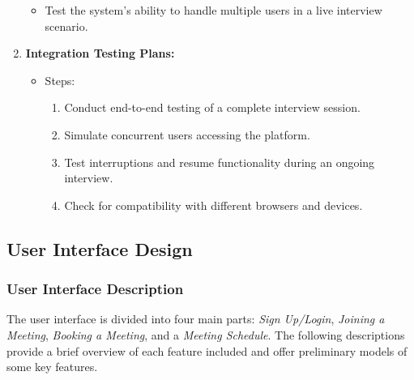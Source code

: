 \documentclass{article}
\begin{document}
\begin{enumerate}
\begin{itemize}
    \item Test the system's ability to handle multiple users in a live interview scenario.
  \end{itemize}
  \item \textbf{Integration Testing Plans:}
  \begin{itemize}
    \item Steps:
    \begin{enumerate}
      \item Conduct end-to-end testing of a complete interview session.
      \item Simulate concurrent users accessing the platform.
      \item Test interruptions and resume functionality during an ongoing interview.
      \item Check for compatibility with different browsers and devices.
    \end{enumerate}
  \end{itemize}
\end{enumerate}

\subsection{User Interface Design}


\subsubsection*{User Interface Description}

The user interface is divided into four main parts: \textit{Sign Up/Login}, \textit{Joining a Meeting}, \textit{Booking a Meeting}, and a \textit{Meeting Schedule}. The following descriptions provide a brief overview of each feature included and offer preliminary models of some key features.
\end{document}

